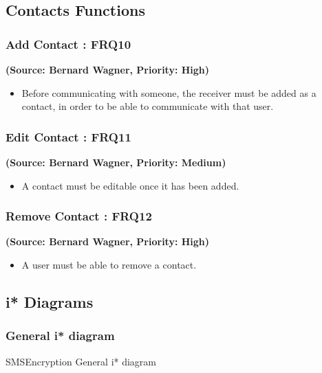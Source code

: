 \subsection{Contacts Functions}

\subsubsection{Add Contact : FRQ10}
\textbf{(Source: Bernard Wagner, Priority: High)}
\begin{itemize}
\item Before communicating with someone, the receiver must be added as a contact, in order to be able to communicate with that user.
\end{itemize}
\subsubsection{Edit Contact : FRQ11}
\textbf{(Source: Bernard Wagner, Priority: Medium)}
\begin{itemize}
\item A contact must be editable once it has been added.
\end{itemize}
\subsubsection{Remove Contact : FRQ12}
\textbf{(Source: Bernard Wagner, Priority: High)}
\begin{itemize}
\item A user must be able to remove a contact.
\end{itemize}


\subsection{i* Diagrams}
\subsubsection{General i* diagram}
SMSEncryption General i* diagram

